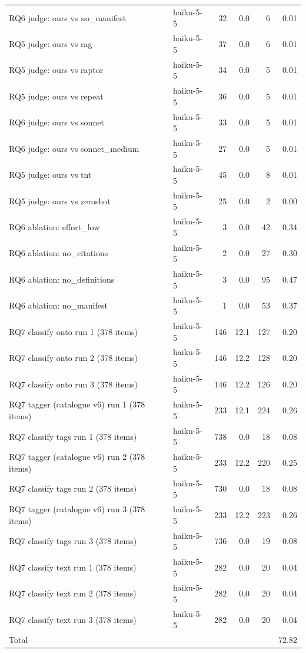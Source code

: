 \begin{tabular}{llrrrr}
RQ6 judge: ours vs no_manifest & haiku-5-5 & 32 & 0.0 & 6 & 0.01 \\
RQ5 judge: ours vs rag & haiku-5-5 & 37 & 0.0 & 6 & 0.01 \\
RQ5 judge: ours vs raptor & haiku-5-5 & 34 & 0.0 & 5 & 0.01 \\
RQ5 judge: ours vs repeat & haiku-5-5 & 36 & 0.0 & 5 & 0.01 \\
RQ6 judge: ours vs sonnet & haiku-5-5 & 33 & 0.0 & 5 & 0.01 \\
RQ6 judge: ours vs sonnet_medium & haiku-5-5 & 27 & 0.0 & 5 & 0.01 \\
RQ5 judge: ours vs tnt & haiku-5-5 & 45 & 0.0 & 8 & 0.01 \\
RQ5 judge: ours vs zeroshot & haiku-5-5 & 25 & 0.0 & 2 & 0.00 \\
RQ6 ablation: effort_low & haiku-5-5 & 3 & 0.0 & 42 & 0.34 \\
RQ6 ablation: no_citations & haiku-5-5 & 2 & 0.0 & 27 & 0.30 \\
RQ6 ablation: no_definitions & haiku-5-5 & 3 & 0.0 & 95 & 0.47 \\
RQ6 ablation: no_manifest & haiku-5-5 & 1 & 0.0 & 53 & 0.37 \\
RQ7 classify onto run 1 (378 items) & haiku-5-5 & 146 & 12.1 & 127 & 0.20 \\
RQ7 classify onto run 2 (378 items) & haiku-5-5 & 146 & 12.2 & 128 & 0.20 \\
RQ7 classify onto run 3 (378 items) & haiku-5-5 & 146 & 12.2 & 126 & 0.20 \\
RQ7 tagger (catalogue v6) run 1 (378 items) & haiku-5-5 & 233 & 12.1 & 224 & 0.26 \\
RQ7 classify tags run 1 (378 items) & haiku-5-5 & 738 & 0.0 & 18 & 0.08 \\
RQ7 tagger (catalogue v6) run 2 (378 items) & haiku-5-5 & 233 & 12.2 & 220 & 0.25 \\
RQ7 classify tags run 2 (378 items) & haiku-5-5 & 730 & 0.0 & 18 & 0.08 \\
RQ7 tagger (catalogue v6) run 3 (378 items) & haiku-5-5 & 233 & 12.2 & 223 & 0.26 \\
RQ7 classify tags run 3 (378 items) & haiku-5-5 & 736 & 0.0 & 19 & 0.08 \\
RQ7 classify text run 1 (378 items) & haiku-5-5 & 282 & 0.0 & 20 & 0.04 \\
RQ7 classify text run 2 (378 items) & haiku-5-5 & 282 & 0.0 & 20 & 0.04 \\
RQ7 classify text run 3 (378 items) & haiku-5-5 & 282 & 0.0 & 20 & 0.04 \\
\midrule
Total & & & & & 72.82 \\
\bottomrule
\end{tabular}
